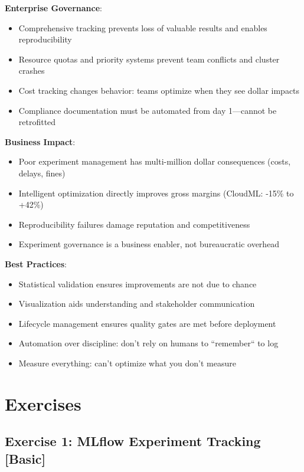 \textbf{Enterprise Governance}:
\begin{itemize}
    \item Comprehensive tracking prevents loss of valuable results and enables reproducibility
    \item Resource quotas and priority systems prevent team conflicts and cluster crashes
    \item Cost tracking changes behavior: teams optimize when they see dollar impacts
    \item Compliance documentation must be automated from day 1---cannot be retrofitted
\end{itemize}

\textbf{Business Impact}:
\begin{itemize}
    \item Poor experiment management has multi-million dollar consequences (costs, delays, fines)
    \item Intelligent optimization directly improves gross margins (CloudML: -15\% to +42\%)
    \item Reproducibility failures damage reputation and competitiveness
    \item Experiment governance is a business enabler, not bureaucratic overhead
\end{itemize}

\textbf{Best Practices}:
\begin{itemize}
    \item Statistical validation ensures improvements are not due to chance
    \item Visualization aids understanding and stakeholder communication
    \item Lifecycle management ensures quality gates are met before deployment
    \item Automation over discipline: don't rely on humans to ``remember`` to log
    \item Measure everything: can't optimize what you don't measure
\end{itemize}

\section{Exercises}

\subsection{Exercise 1: MLflow Experiment Tracking [Basic]}

